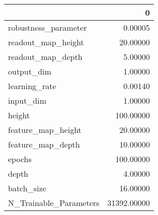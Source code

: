 \begin{tabular}{lr}
\toprule
{} &            0 \\
\midrule
robustness\_parameter   &      0.00005 \\
readout\_map\_height     &     20.00000 \\
readout\_map\_depth      &      5.00000 \\
output\_dim             &      1.00000 \\
learning\_rate          &      0.00140 \\
input\_dim              &      1.00000 \\
height                 &    100.00000 \\
feature\_map\_height     &     20.00000 \\
feature\_map\_depth      &     10.00000 \\
epochs                 &    100.00000 \\
depth                  &      4.00000 \\
batch\_size             &     16.00000 \\
N\_Trainable\_Parameters &  31392.00000 \\
\bottomrule
\end{tabular}
